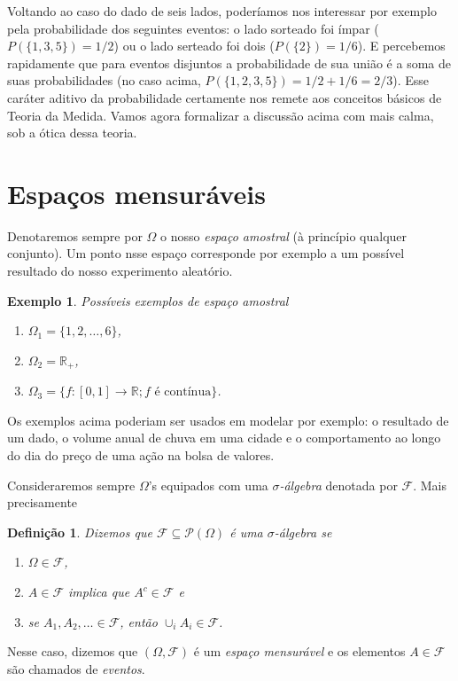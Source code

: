 \documentclass[reqno, final]{book}
\newcommand*\1{\mathds{1}}
\newtheorem{definition}[theorem]{Definição}
\newtheorem{example}{Exemplo}[section]
\begin{document}
Voltando ao caso do dado de seis lados, poderíamos nos interessar por exemplo pela probabilidade dos seguintes eventos: o lado sorteado foi ímpar ($P(\{1,3,5\}) = 1/2$) ou o lado serteado foi dois ($P(\{2\}) = 1/6$).
E percebemos rapidamente que para eventos disjuntos a probabilidade de sua união é a soma de suas probabilidades (no caso acima, $P(\{1,2,3,5\}) = 1/2 + 1/6 = 2/3$).
Esse caráter aditivo da probabilidade certamente nos remete aos conceitos básicos de Teoria da Medida.
Vamos agora formalizar a discussão acima com mais calma, sob a ótica dessa teoria.

\section{Espaços mensuráveis}

Denotaremos sempre por $\Omega$ o nosso \emph{espaço amostral}  (à princípio qualquer conjunto).
Um ponto nsse espaço corresponde por exemplo a um possível resultado do nosso experimento aleatório.

\begin{example} Possíveis exemplos de espaço amostral
  \label{x:espacos_amostrais}
  \begin{enumerate}[\quad a)]
  \item $\Omega_1 = \{1, 2, \dots, 6\}$,
  \item $\Omega_2 = \mathbb{R}_+$,
  \item $\Omega_3 = \{f:[0,1] \to \mathbb{R}; \text{$f$ é contínua}\}$.
  \end{enumerate}
\end{example}
Os exemplos acima poderiam ser usados em modelar por exemplo: o resultado de um dado, o volume anual de chuva em uma cidade e o comportamento ao longo do dia do preço de uma ação na bolsa de valores.

Consideraremos sempre $\Omega$'s equipados com uma \emph{$\sigma$-álgebra}  denotada por $\mathcal{F}$.
Mais precisamente
\begin{definition}
  Dizemos que $\mathcal{F} \subseteq \mathcal{P}(\Omega)$ é uma $\sigma$-álgebra se
  \begin{enumerate}[\quad a)]
  \item $\Omega \in \mathcal{F}$,
  \item $A \in \mathcal{F}$ implica que $A^c \in \mathcal{F}$ e
  \item se $A_1, A_2, \dots \in \mathcal{F}$, então $\cup_i A_i \in \mathcal{F}$.
  \end{enumerate}
\end{definition}
Nesse caso, dizemos que $(\Omega, \mathcal{F})$ é um \emph{espaço mensurável}  e os elementos $A \in \mathcal{F}$ são chamados de \emph{eventos}. 
\end{document}
